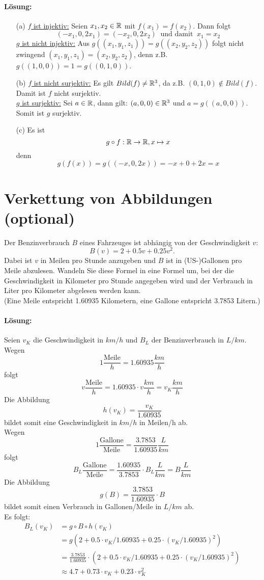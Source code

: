 \documentclass[
				a4paper,
				10pt
			]
			{scrartcl}
\begin{document}
\paragraph{L\"osung:}
\begin{itemize}
\item[(a)]
\underline{$f$ ist injektiv:} Seien $x_1, x_2 \in \mathbb{R}$ mit $f(x_1)=f(x_2)$. Dann folgt $$(-x_1,0,2x_1)=(-x_2,0,2x_2) \ \text{ und damit } \ x_1=x_2$$
\underline{$g$ ist nicht injektiv:} Aus $g((x_1,y_1,z_1))=g((x_2,y_2,z_2))$ folgt nicht zwingend $(x_1,y_1,z_1)=(x_2,y_2,z_2)$, denn z.B. $g((1,0,0))=1=g((0,1,0))$.
 
\item[(b)] 
\underline{$f$ ist nicht surjektiv:} Es gilt $Bild(f) \ne \mathbb{R}^3$, da z.B. $(0,1,0) \notin Bild(f)$. Damit ist $f$ nicht surjektiv.\\
\underline{$g$ ist surjektiv:} Sei $a \in \mathbb{R}$, dann gilt: $(a,0,0) \in \mathbb{R}^3$ und $a=g((a,0,0))$. Somit ist $g$ surjektiv.
\item[(c)]
Es ist
$$ g\circ f : \mathbb{R} \to \mathbb{R}, x \mapsto x$$
denn 
$$g(f(x))=g((-x,0,2x))=-x+0+2x=x$$ 
\end{itemize}

\newpage
\section{Verkettung von Abbildungen (optional)}

Der Benzinverbrauch $B$ eines Fahrzeuges ist abh\"angig von der Geschwindigkeit $v$:
$$ 
	B(v) = 2 + 0.5v + 0.25v^2.
$$
Dabei ist $v$ in Meilen pro Stunde anzugeben und $B$ ist in (US-)Gallonen pro Meile abzulesen. 
Wandeln Sie diese Formel in eine Formel um, bei der die Geschwindigkeit in Kilometer pro Stunde angegeben wird und 
der Verbrauch in Liter pro Kilometer abgelesen werden kann.\\
(Eine Meile entspricht 1.60935 Kilometern, eine Gallone entspricht 3.7853 Litern.)

\paragraph{L\"osung:}

Seien $v_K$ die Geschwindigkeit in $km/h$ und $B_L$ der Benzinverbrauch in $L/km$.
Wegen 
$$
	1 \frac{\text{Meile}}{h} = 1.60935 \frac{km}{h}  
$$
folgt
$$
	v \frac{\text{Meile}}{h} = 1.60935\cdot v \frac{km}{h}  = v_K  \frac{km}{h}  
$$
Die Abbildung
$$
	h(v_K) = \frac{v_K}{1.60935}
$$
bildet somit eine Geschwindigkeit in $km/h$ in Meilen/h ab.\\
Wegen
$$
	1 \frac{\text{Gallone}}{\text{Meile}} = \frac{3.7853}{1.60935}\frac{L}{km}
$$
folgt
$$
 	B_L \frac{\text{Gallone}}{\text{Meile}} =  \frac{1.60935}{3.7853}\cdot B_L \frac{L}{km} = B \frac{L}{km}
$$
Die Abbildung
$$
	g(B) = \frac{3.7853}{1.60935}\cdot B
$$
bildet somit einen Verbrauch in Gallonen/Meile in $L/km$ ab.\\

Es folgt:
\begin{align*}
	B_L(v_K) &= g\circ B \circ h(v_K)	\\ 
			&= g( 2 + 0.5\cdot v_K/1.60935 + 0.25\cdot (v_K/1.60935)^2  )\\
			&= \frac{3.7853}{1.60935}\cdot ( 2 + 0.5\cdot v_K/1.60935 + 0.25\cdot (v_K/1.60935)^2  )	\\
			&\approx 4.7 + 0.73\cdot v_K + 0.23\cdot v_K^2 
\end{align*}
\end{document}
